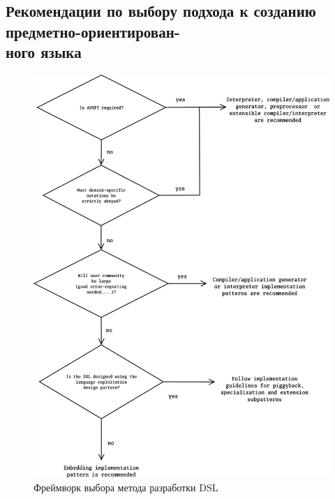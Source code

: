\begin{appendices}
\section{Рекомендации по выбору подхода \newline  к созданию предметно-ориентирован-\\ного языка}
\label{appendixA}

\begin{figure}[h]
\label{appendix:dslimplapproachguideline}
\centering
\includegraphics[width=\linewidth,height=1.1\linewidth,keepaspectratio]{resources/dsl-implementation-guideline.png}
\caption{Фреймворк выбора метода разработки DSL~\cite{when-and-how-develop-dsl}}
\end{figure}

\end{appendices}
